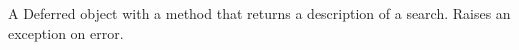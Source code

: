 A Deferred object with a  method that returns a description of a
search.  Raises an exception on error.
